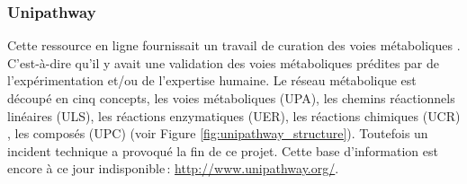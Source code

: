 \begin{refsegment}
    \subsubsection{Unipathway}
    
    Cette ressource en ligne fournissait un travail de curation des voies métaboliques \cite{morgat2011unipathway}. C'est-à-dire qu'il y avait une validation des voies métaboliques prédites par de l'expérimentation et/ou de l'expertise humaine. Le réseau métabolique est découpé en cinq concepts, les voies métaboliques (\gls{UPA}), les chemins réactionnels linéaires (\gls{ULS}), les réactions enzymatiques (\gls{UER}), les réactions chimiques (\gls{UCR}) , les composés (\gls{UPC}) (voir Figure \ref{fig:unipathway_structure}).  Toutefois un incident technique a provoqué la fin de ce projet. Cette base d'information est encore à ce jour indisponible : \url{http://www.unipathway.org/}.
    
    

\end{refsegment}
